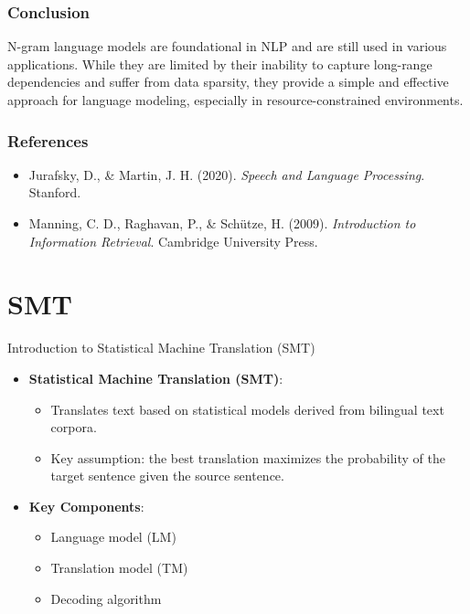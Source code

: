 \documentclass{beamer}
\begin{document}

\begin{frame}
\frametitle{Conclusion}
N-gram language models are foundational in NLP and are still used in various applications. While they are limited by their inability to capture long-range dependencies and suffer from data sparsity, they provide a simple and effective approach for language modeling, especially in resource-constrained environments.
\end{frame}

\begin{frame}
\frametitle{References}
\begin{itemize}
    \item Jurafsky, D., & Martin, J. H. (2020). \textit{Speech and Language Processing}. Stanford.
    \item Manning, C. D., Raghavan, P., & Schütze, H. (2009). \textit{Introduction to Information Retrieval}. Cambridge University Press.
\end{itemize}
\end{frame}

\section{SMT}

\begin{frame}{Introduction to Statistical Machine Translation (SMT)}
    \begin{itemize}
        \item \textbf{Statistical Machine Translation (SMT)}:
        \begin{itemize}
            \item Translates text based on statistical models derived from bilingual text corpora.
            \item Key assumption: the best translation maximizes the probability of the target sentence given the source sentence.
        \end{itemize}
        \item \textbf{Key Components}:
        \begin{itemize}
            \item Language model (LM)
            \item Translation model (TM)
            \item Decoding algorithm
        \end{itemize}
    \end{itemize}
\end{frame}
\end{document}
